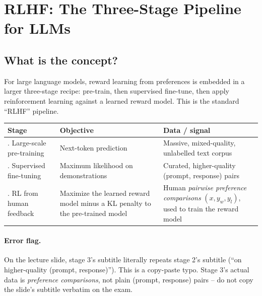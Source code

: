 \documentclass[11pt]{article}
\begin{document}
\section{RLHF: The Three-Stage Pipeline for LLMs}

\subsection{What is the concept?}
For large language models, reward learning from preferences is embedded in a
larger three-stage recipe: pre-train, then supervised fine-tune, then apply
reinforcement learning against a learned reward model. This is the standard
``RLHF'' pipeline.

\begin{center}
\begin{longtable}{|>{\raggedright\arraybackslash}p{3.2cm}|>{\raggedright\arraybackslash}p{4.8cm}|>{\raggedright\arraybackslash}p{5.3cm}|}
\hline
\textbf{Stage} & \textbf{Objective} & \textbf{Data / signal} \\
\hline
1. Large-scale pre-training & Next-token prediction & Massive, mixed-quality,
unlabelled text corpus \\
\hline
2. Supervised fine-tuning & Maximum likelihood on demonstrations & Curated,
higher-quality (prompt, response) pairs \\
\hline
3. RL from human feedback & Maximize the learned reward model minus a KL penalty
to the pre-trained model & Human \emph{pairwise preference comparisons}
$(x, y_w, y_l)$, used to train the reward model \\
\hline
\end{longtable}
\end{center}

\paragraph{Error flag.} On the lecture slide, stage 3's subtitle literally repeats
stage 2's subtitle (``on higher-quality (prompt, response)''). This is a
copy-paste typo. Stage 3's actual data is \emph{preference comparisons}, not
plain (prompt, response) pairs -- do not copy the slide's subtitle verbatim on
the exam.
\end{document}
